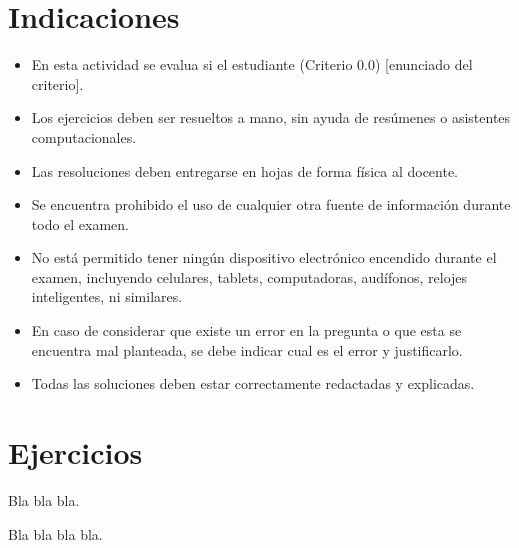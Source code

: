 \documentclass[11pt,respuestas,a4]{aleph-examen}
\begin{document}
\encabezado

\section*{Indicaciones}
\begin{itemize}[leftmargin=*]
\item
	En esta actividad se evalua si el estudiante (Criterio 0.0) [enunciado del criterio].
\item
    Los ejercicios deben ser resueltos a mano, sin ayuda de resúmenes o asistentes computacionales.
\item
	Las resoluciones deben entregarse en hojas de forma física al docente.
\item
	Se encuentra prohibido el uso de cualquier otra fuente de información durante todo el examen.
\item 
    No está permitido tener ningún dispositivo electrónico encendido durante el examen, incluyendo celulares, tablets, computadoras, audífonos, relojes inteligentes, ni similares.
\item
	En caso de considerar que existe un error en la pregunta o que esta se encuentra mal planteada, se debe indicar cual es el error y justificarlo.
\item
	Todas las soluciones deben estar correctamente redactadas y explicadas.
\end{itemize}

\section*{Ejercicios}



\begin{preguntas}
\item
    Bla bla bla. 

\begin{respuesta}
    Bla bla bla bla.
\end{respuesta}


\end{preguntas}
\end{document}
